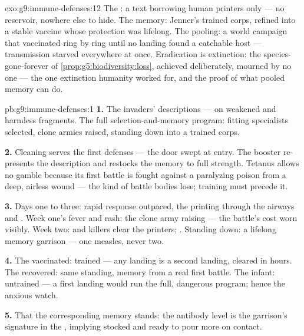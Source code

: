 \begin{solution}{exo:g9:immune-defenses:12}
The : a text borrowing human printers only ---
no  reservoir, nowhere else to hide. The memory:
Jenner's trained corps, refined into a stable vaccine
whose protection was lifelong. The pooling: a world
campaign that vaccinated ring by ring until no landing
found a catchable host --- transmission starved
everywhere at once. Eradication is extinction: the
species-gone-forever of
\cref{prop:g5:biodiversity:loss}, achieved deliberately,
mourned by no one --- the one extinction humanity worked
for, and the proof of what pooled memory can do.
\end{solution}

\begin{solution}{pb:g9:immune-defenses:1}
\textbf{1.} The invaders' descriptions ---  on
weakened  and harmless fragments. The full
selection-and-memory program: fitting specialists
selected, clone armies raised,  standing
down into a trained corps.

\textbf{2.} Cleaning serves the first defenses ---
the door swept at entry. The booster re-presents the
description and restocks the memory to full strength.
Tetanus allows no gamble because its first battle is
fought against a paralyzing poison from a deep, airless
wound --- the kind of battle bodies lose; training must
precede it.

\textbf{3.} Days one to three: rapid response outpaced,
the  printing through the airways and . Week
one's fever and rash: the clone army raising --- the
battle's cost worn visibly. Week two:  and
killers clear the printers; . Standing down: a
lifelong memory garrison --- one measles, never two.

\textbf{4.} The vaccinated: trained --- any landing is a
second landing, cleared in hours. The recovered: same
standing, memory from a real first battle. The infant:
untrained --- a first landing would run the full,
dangerous program; hence the anxious watch.

\textbf{5.} That the corresponding memory stands: the
antibody level is the garrison's signature in the ,
implying  stocked and ready to pour more on
contact.


\end{solution}
